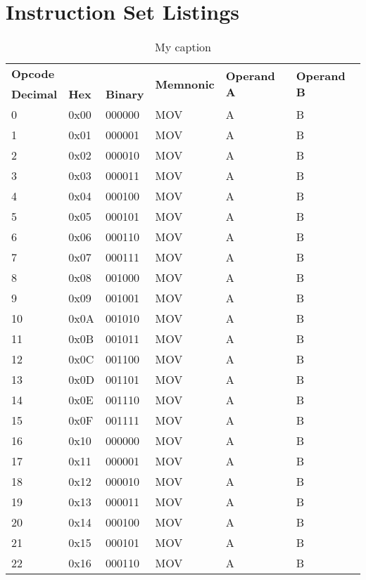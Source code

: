 \documentclass[twoside,a4paper]{memoir}
\begin{document}
\chapter{Instruction Set Listings}
\begin{table}[]
\centering
\caption{My caption}
\label{my-label}
\begin{tabular}{|l|l|l|l|l|l|}
\hline
\multicolumn{3}{|l|}{\textbf{Opcode}} & \multirow{2}{*}{\textbf{Memnonic}} & \multirow{2}{*}{\textbf{Operand A}} & \multirow{2}{*}{\textbf{Operand B}} \\ \cline{1-3}
\textbf{Decimal} & \textbf{Hex} & \textbf{Binary} &  &  &  \\ \hline
0  & 0x00 & 000000 & MOV   & A & B \\ \hline
1  & 0x01 & 000001 & MOV   & A & B \\ \hline
2  & 0x02 & 000010 & MOV   & A & B \\ \hline
3  & 0x03 & 000011 & MOV   & A & B \\ \hline
4  & 0x04 & 000100 & MOV   & A & B \\ \hline
5  & 0x05 & 000101 & MOV   & A & B \\ \hline
6  & 0x06 & 000110 & MOV   & A & B \\ \hline
7  & 0x07 & 000111 & MOV   & A & B \\ \hline
8  & 0x08 & 001000 & MOV   & A & B \\ \hline
9  & 0x09 & 001001 & MOV   & A & B \\ \hline
10 & 0x0A & 001010 & MOV   & A & B \\ \hline
11 & 0x0B & 001011 & MOV   & A & B \\ \hline
12 & 0x0C & 001100 & MOV   & A & B \\ \hline
13 & 0x0D & 001101 & MOV   & A & B \\ \hline
14 & 0x0E & 001110 & MOV  & A & B \\ \hline
15 & 0x0F & 001111 & MOV  & A & B \\ \hline
16 & 0x10 & 000000 & MOV  & A & B \\ \hline
17 & 0x11 & 000001 & MOV  & A & B \\ \hline
18 & 0x12 & 000010 & MOV  & A & B \\ \hline
19 & 0x13 & 000011 & MOV  & A & B \\ \hline
20 & 0x14 & 000100 & MOV  & A & B \\ \hline
21 & 0x15 & 000101 & MOV  & A & B \\ \hline
22 & 0x16 & 000110 & MOV  & A & B \\ \hline

\end{tabular}
\end{table}
\end{document}
